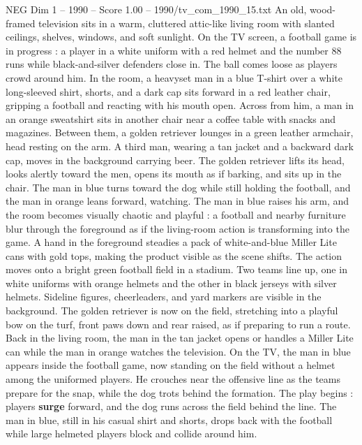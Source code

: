 \begin{textsample}{NEG Dim 1 – 1990 – Score 1.00 – 1990/tv\_com\_1990\_15.txt}  \label{ex:f1_neg_060}
An old, wood-framed television sits in a warm, cluttered attic-like living room with slanted ceilings, shelves, windows, and soft sunlight.
On the TV screen, a football game is in progress : a player in a white uniform with a red helmet and the number 88 runs while black-and-silver defenders close in.
The ball comes loose as players crowd around him.
In the room, a heavyset man in a blue T-shirt over a white long-sleeved shirt, shorts, and a dark cap sits forward in a red leather chair, gripping a football and reacting with his mouth open.
Across from him, a man in an orange sweatshirt sits in another chair near a coffee table with snacks and magazines.
Between them, a golden retriever lounges in a green leather armchair, head resting on the arm.
A third man, wearing a tan jacket and a backward dark cap, moves in the background carrying beer.
The golden retriever lifts its head, looks alertly toward the men, opens its mouth as if barking, and sits up in the chair.
The man in blue turns toward the dog while still holding the football, and the man in orange leans forward, watching.
The man in blue raises his arm, and the room becomes visually chaotic and playful : a football and nearby furniture blur through the foreground as if the living-room action is transforming into the game.
A hand in the foreground steadies a pack of white-and-blue Miller Lite cans with gold tops, making the product visible as the scene shifts.
The action moves onto a bright green football field in a stadium.
Two teams line up, one in white uniforms with orange helmets and the other in black jerseys with silver helmets.
Sideline figures, cheerleaders, and yard markers are visible in the background.
The golden retriever is now on the field, stretching into a playful bow on the turf, front paws down and rear raised, as if preparing to run a route.
Back in the living room, the man in the tan jacket opens or handles a Miller Lite can while the man in orange watches the television.
On the TV, the man in blue appears inside the football game, now standing on the field without a helmet among the uniformed players.
He crouches near the offensive line as the teams prepare for the snap, while the dog trots behind the formation.
The play begins : players \textbf{surge} forward, and the dog runs across the field behind the line.
The man in blue, still in his casual shirt and shorts, drops back with the football while large helmeted players block and collide around him.

\end{textsample}
